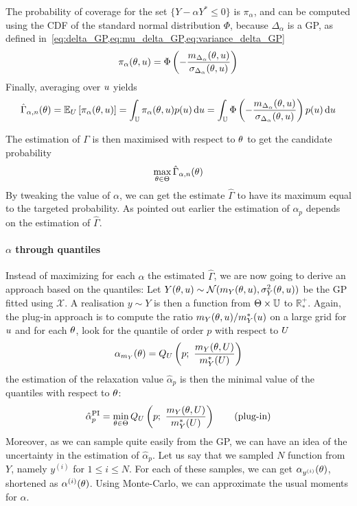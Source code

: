 \documentclass[../../Main_ManuscritThese.tex]{subfiles}
\begin{document}
The probability of coverage for the set $\{Y - \alpha Y^*\leq 0\}$ is $\pi_{\alpha}$, and can be computed using the CDF of the standard normal distribution $\Phi$, because $\Delta_{\alpha}$ is a GP, as defined in~\cref{eq:delta_GP,eq:mu_delta_GP,eq:variance_delta_GP}
\begin{equation}
  \pi_{\alpha}(\theta,u) = \Phi\left(-\frac{m_{\Delta_\alpha}(\theta,u)}{\sigma_{\Delta_\alpha}(\theta,u)}\right)
\end{equation}
Finally, averaging over $u$ yields
\begin{equation}
  \hat{\Gamma}_{\alpha,n}(\theta) = \mathbb{E}_U\left[\pi_{\alpha}(\theta,u)\right]=\int_{\mathbb{U}}\pi_{\alpha}(\theta,u)p(u) \,\mathrm{d}u = \int_{\mathbb{U}}\Phi\left(-\frac{m_{\Delta_\alpha}(\theta,u)}{\sigma_{\Delta_\alpha}(\theta,u)}\right)p(u) \,\mathrm{d}u
\end{equation}

The estimation of $\Gamma$ is then maximised with respect to $\theta$ to get the candidate probability
\begin{equation}
\max_{\theta\in\Theta}  \hat{\Gamma}_{\alpha,n}(\theta) 
\end{equation}
By tweaking the value of $\alpha$, we can get the estimate $\hat{\Gamma}$ to have its maximum equal to the targeted probability. 
As pointed out earlier the estimation of $\alpha_p$ depends on the estimation of $\hat{\Gamma}$.
\paragraph{$\alpha$ through quantiles}
Instead of maximizing for each $\alpha$ the estimated $\hat{\Gamma}$, we are now going to derive an approach based on the quantiles:
Let $Y(\theta, u) \sim \mathcal{N}(m_Y(\theta,u), \sigma^2_{Y}(\theta, u))$ be the GP fitted using $\mathcal{X}$. A realisation $y\sim Y$ is then a function from $\Theta \times \mathbb{U}$ to $\mathbb{R}^{+}_*$.
Again, the plug-in approach is to compute the ratio $m_Y(\theta, u) / m^*_Y(u)$ on a large grid for $u$ and for each $\theta$, look for the quantile of order $p$ with respect to $U$
\begin{equation}
  \alpha_{m_{Y}}(\theta) = Q_{U}\left(p;~\frac{m_Y(\theta, U)}{m^*_Y(U)}\right)
\end{equation}
the estimation of the relaxation value $\hat{\alpha}_p$ is then the minimal value of the quantiles with respect to $\theta$:
\begin{equation}
    \label{eq:def_plugin_alpha}
  \hat{\alpha}^{\mathrm{PI}}_p = \min_{\theta \in \Theta} Q_U\left(p;~\frac{m_Y(\theta, U)}{m^*_Y(U)}\right)  \tag{plug-in}
\end{equation}
Moreover, as we can sample quite easily from the GP, we can have an idea of the uncertainty in the estimation of $\hat{\alpha}_p$.
Let us say that we sampled $N$ function from $Y$, namely $y^{(i)}$ for $1 \leq i \leq N$. For each of these samples, we can get $\alpha_{y^{(i)}}(\theta)$, shortened as $\alpha^{(i)}(\theta)$. Using Monte-Carlo, we can approximate the usual moments for $\alpha$.
\end{document}
